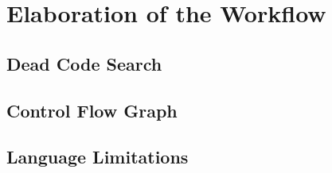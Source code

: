\chapter{Elaboration of the Workflow}
\label{chap:elaboration-of-the-workflow}

\section{Dead Code Search}

\section{Control Flow Graph}

\section{Language Limitations}
